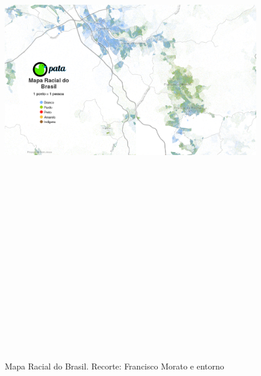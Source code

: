 	\begin{landscape}
		\begin{figure}[h]
			\centering
			\caption{Mapa Racial do Brasil. Recorte: Francisco Morato e entorno}
			\includegraphics[width=25cm,height=24cm,keepaspectratio]{img/mapa_racial.png}
			\label{mapa_racial_pata}
		\end{figure}
	\end{landscape}
	

